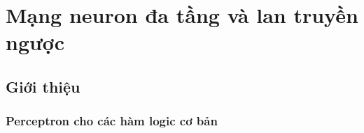 \chapter{Mạng neuron đa tầng và lan truyền ngược}
\label{cha:mlp}



\section{Giới thiệu}



\subsection{Perceptron cho các hàm logic cơ bản}

